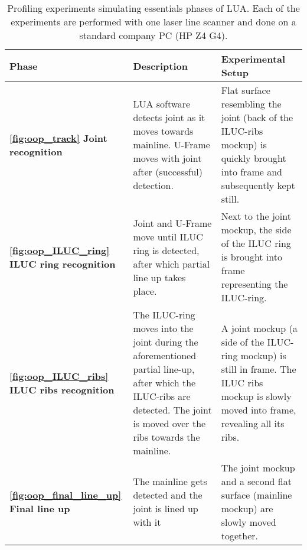 \begin{table}[H]
    \centering
    \begin{tabular}{|p{4cm}|p{5.5cm}|p{5cm}|}
        \hline
        \textbf{Phase}& \textbf{Description} & \textbf{Experimental Setup} \\ \hline

        \textbf{\ref{fig:oop_track} Joint recognition} & LUA software detects joint as it moves towards mainline. U-Frame moves with joint after (successful) detection. & Flat surface resembling the joint (back of the ILUC-ribs mockup) is quickly brought into frame and subsequently kept still.\\ \hline

        \textbf{\ref{fig:oop_ILUC_ring} ILUC ring recognition} & Joint and U-Frame move until ILUC ring is detected, after which partial line up takes place. & Next to the joint mockup, the side of the ILUC ring is brought into frame representing the ILUC-ring.\\ \hline

        \textbf{\ref{fig:oop_ILUC_ribs} ILUC ribs recognition} & The ILUC-ring moves into the joint during the aforementioned partial line-up, after which the ILUC-ribs are detected. The joint is moved over the ribs towards the mainline. & A joint mockup (a side of the ILUC-ring mockup) is still in frame. The ILUC ribs mockup is slowly moved into frame, revealing all its ribs. \\ \hline

        \textbf{\ref{fig:oop_final_line_up} Final line up}  & The mainline gets detected and the joint is lined up with it & The joint mockup and a second flat surface (mainline mockup) are slowly moved together. \\ \hline
    \end{tabular}
    \caption{Profiling experiments simulating essentials phases of LUA. Each of the experiments are performed with one laser line scanner and done on a standard company PC (HP Z4 G4).}
    \label{tab:experimental_phases}
\end{table}